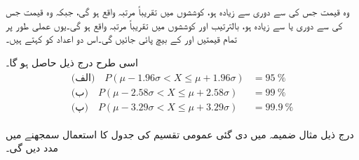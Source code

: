 وہ قیمت جس کی  سے دوری   سے زیادہ ہو،  کوششوں میں تقریباً    مرتبہ واقع ہو گی، جبکہ  وہ قیمت جس کی  سے دوری  یا   سے زیادہ ہو، بالترتیب   اور  کوششوں  میں تقریباً    مرتبہ واقع ہو گی۔یوں عملی طور پر تمام قیمتیں  اور  کے بیچ پائی جائیں گی۔اس دو اعداد کو  کہتے ہیں۔

اسی طرح درج ذیل حاصل ہو گا۔
\begin{gather}
\begin{aligned}\label{مساوات_شماریات_چند_نتائج}
\text{(الف)}\quad P(\mu-1.96\sigma<X\le \mu+1.96\sigma)&=\SI{95}{\percent}\\
\text{(ب)}\quad P(\mu-2.58\sigma<X\le \mu+2.58\sigma)&=\SI{99}{\percent}\\
\text{(پ)}\quad P(\mu-3.29\sigma<X\le \mu+3.29\sigma)&=\SI{99.9}{\percent}
\end{aligned}
\end{gather}

درج ذیل مثال ضمیمہ  میں دی گئی عمومی تقسیم کی جدول کا استعمال سمجھنے میں مدد دیں گی۔

